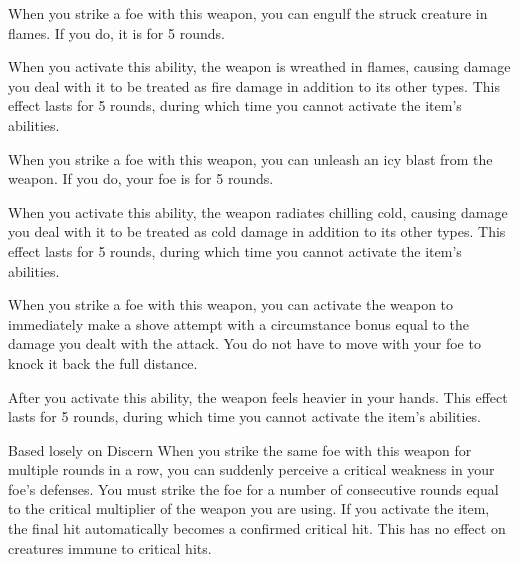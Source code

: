  When you strike a foe with this weapon, you can engulf the struck creature in flames.
If you do, it is \ignited for 5 rounds.

When you activate this ability, the weapon is wreathed in flames, causing damage you deal with it to be treated as fire damage in addition to its other types.
This effect lasts for 5 rounds, during which time you cannot activate the item's abilities.


 When you strike a foe with this weapon, you can unleash an icy blast from the weapon.
If you do, your foe is \fatigued for 5 rounds.

When you activate this ability, the weapon radiates chilling cold, causing damage you deal with it to be treated as cold damage in addition to its other types.
This effect lasts for 5 rounds, during which time you cannot activate the item's abilities.


 When you strike a foe with this weapon, you can activate the weapon to immediately make a shove attempt with a circumstance bonus equal to the damage you dealt with the attack.
You do not have to move with your foe to knock it back the full distance.

After you activate this ability, the weapon feels heavier in your hands.
This effect lasts for 5 rounds, during which time you cannot activate the item's abilities.


Based losely on Discern
 When you strike the same foe with this weapon for multiple rounds in a row, you can suddenly perceive a critical weakness in your foe's defenses.
You must strike the foe for a number of consecutive rounds equal to the critical multiplier of the weapon you are using.
If you activate the item, the final hit automatically becomes a confirmed critical hit.
This has no effect on creatures immune to critical hits.

